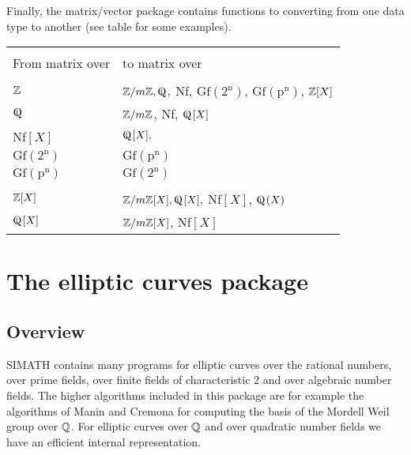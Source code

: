 Finally, the matrix/vector package contains functions to converting from one
data type to another (see table for some examples).

\leer

{\bf
\begin{center}
\begin{tabular}{|p{1.5in}|p{3.5in}|}
\hline &\\[-1.3ex]
From matrix over&
to matrix over\\[1.5ex]
\hline &\\[-1.3ex]
$\mbox{$\mathbb Z$}$ & $\Z/m\Z, \Qfett,$ Nf, $\mbox{Gf}(2^{\mbox{n}})$, $\mbox{Gf}(\mbox{p}^{\mbox{n}})$, $\mbox{$\mathbb Z$}[X]$ \\
$\Qfett$ & $\mbox{$\mathbb Z$}/m\mbox{$\mathbb Z$}$, Nf, $\Qfett[X]$\\
Nf$[X]$ & $\Qfett[X],$ \\
$\mbox{Gf}(2^{\mbox{n}})$ & $\mbox{Gf}(\mbox{p}^{\mbox{n}})$ \\
$\mbox{Gf}(\mbox{p}^{\mbox{n}})$ & $\mbox{Gf}(2^{\mbox{n}})$ \\ [1.5ex]
\hline &\\[-1.3ex]
$\mbox{$\mathbb Z$}[X]$ & $\Z/m\Z[X], \Qfett[X],$ Nf$[X]$, $\Qfett(X)$ \\
$\Qfett[X]$ & $\mbox{$\mathbb Z$}/m\mbox{$\mathbb Z$}[X]$, Nf$[X]$\\ [1.5ex]
\hline
\end{tabular}
\end{center} }



\newpage




\section{The elliptic curves package}
\subsection{Overview}
SIMATH contains many programs for elliptic curves over the rational
numbers, over prime fields, over finite fields of characteristic $2$ and
over algebraic number fields. The higher algorithms included in this
package are for example the algorithms of Manin and Cremona for
computing the basis of the Mordell Weil group over $\mbox{$\mathbb Q$}$. For elliptic
curves over $\mbox{$\mathbb Q$}$ and over quadratic number fields we have an efficient
internal representation.

